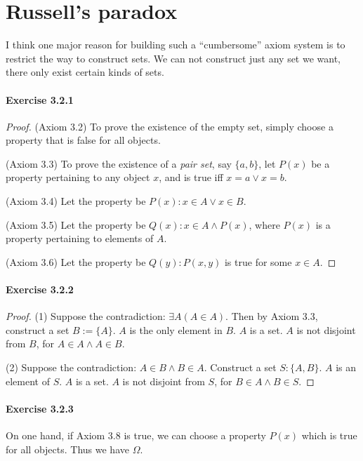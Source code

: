 \section{Russell's paradox}
I think one major reason for building such a ``cumbersome'' axiom system is to restrict the way to 
construct sets. We can not construct just any set we want, there only exist certain kinds of sets.

\paragraph{Exercise 3.2.1} \label{exercise3.2.1}
\begin{proof}
(Axiom 3.2) To prove the existence of the empty set, simply choose a property that is false for all 
objects.

(Axiom 3.3) To prove the existence of a \emph{pair set}, say $\{a,b\}$, let $P(x)$ be a property 
pertaining to any object $x$, and is true iff $x = a \vee x = b$.

(Axiom 3.4) Let the property be $P(x): x \in A \vee x \in B$.

(Axiom 3.5) Let the property be $Q(x): x \in A \wedge P(x)$, where $P(x)$ is a property pertaining to 
elements of $A$.

(Axiom 3.6) Let the property be $Q(y): P(x,y)$ is true for some $x \in A$.
\end{proof}

\paragraph{Exercise 3.2.2} \label{exercise3.2.2}
\begin{proof}
(1)
Suppose the contradiction: $\exists A(A \in A)$. Then by Axiom 3.3, construct a set $B:= \{A\}$. $A$ is 
the only element in $B$. $A$ is a set. $A$ is not disjoint from $B$, for $A \in A \wedge A \in B$. 

(2)
Suppose the contradiction: $A \in B \wedge B \in A$. Construct a set $S: \{A,B\}$. $A$ is an element of 
$S$. $A$ is a set. $A$ is not disjoint from $S$, for $B \in A \wedge B \in S$.
\end{proof}

\paragraph{Exercise 3.2.3} \label{exercise3.2.3}
On one hand, if Axiom 3.8 is true, we can choose a property $P(x)$ which is true for all objects. Thus 
we have $\Omega$.


